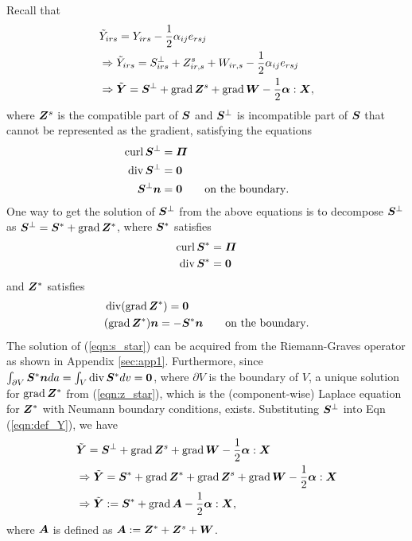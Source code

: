 \documentclass[11pt,letterpaper]{article}
\begin{document}
Recall that 
\begin{eqnarray}\label{eqn:def_Y}
\begin{aligned}
&\tilde{Y}_{irs} = Y_{irs} -\frac{1}{2}\alpha_{ij}e_{rsj} \\
&\Rightarrow \tilde{Y}_{irs} = S^{\perp}_{irs} + Z^s_{ir,s} + W_{ir,s} - \frac{1}{2}\alpha_{ij}e_{rsj} \\
&\Rightarrow \tilde{\bfY} = \bfS^{\perp} + \grad\bfZ^s + \grad \bfW - \frac{1}{2}\bfalpha : \bfX,
\end{aligned}
\end{eqnarray}
where $\bfZ^s$ is the compatible part of $\bfS$ and $\bfS^{\perp}$  is incompatible part of $\bfS$ that cannot be represented as the gradient, satisfying the equations
\begin{eqnarray*}
\begin{aligned}
\curl \bfS^{\perp} &= \bfPi \\
\divergence \bfS^{\perp} &= \bf0 \\
\bfS^{\perp}\bfn &= \bf0 \qquad \text{on the boundary}.
\end{aligned}
\end{eqnarray*}
One way to get the solution of $\bfS^{\perp}$ from the above equations is to decompose $\bfS^{\perp}$ as $\bfS^{\perp}= \bfS^*+\grad \bfZ^*$, where $\bfS^*$ satisfies
\begin{eqnarray}\label{eqn:s_star}
\begin{aligned}
\curl \bfS^* &= \bfPi \\
\divergence \bfS^* &= \bf0 
\end{aligned}
\end{eqnarray}
and $\bfZ^*$ satisfies
\begin{eqnarray}\label{eqn:z_star}
\begin{aligned}
&\divergence (\grad \bfZ^*) = \bf0 \\
&(\grad \bfZ^*) \bfn = -\bfS^*\bfn \qquad \text{on the boundary} .
\end{aligned}
\end{eqnarray}
The solution of (\ref{eqn:s_star}) can be acquired from the Riemann-Graves operator as shown in Appendix \ref{sec:app1}. Furthermore, since $\int_{\partial V} \bfS^* \bfn da = \int_V \divergence \bfS^* dv = \bf0$, where $\partial V$ is the boundary of $V$, a unique solution for $\grad \bfZ^*$ from (\ref{eqn:z_star}), which is the (component-wise) Laplace equation for $\bfZ^*$ with Neumann boundary conditions, exists. Substituting $\bfS^{\perp}$ into Eqn (\ref{eqn:def_Y}), we have
\begin{eqnarray}\label{S*}
\begin{aligned}
&\tilde{\bfY} = \bfS^{\perp} + \grad\bfZ^s + \grad \bfW - \frac{1}{2}\bfalpha : \bfX \\
&\Rightarrow  \tilde{\bfY} = \bfS^* + \grad \bfZ^* + \grad\bfZ^s + \grad \bfW - \frac{1}{2}\bfalpha : \bfX \\
& \Rightarrow \tilde{\bfY} := \bfS^* + \grad \bfA - \frac{1}{2}\bfalpha:\bfX,
\end{aligned}
\end{eqnarray}
where $\bfA$ is defined as $\bfA := \bfZ^*+\bfZ^s+\bfW$.
\end{document}
